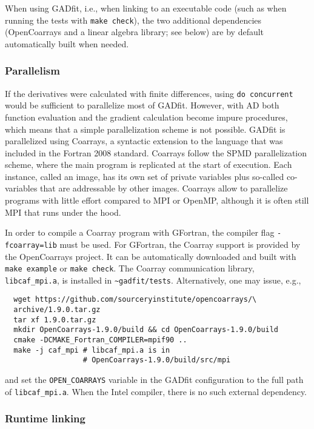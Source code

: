\documentclass{article}
\begin{document}
When using GADfit, i.e., when linking to an executable code (such as when running the tests with \texttt{make check}), the two additional dependencies (OpenCoarrays and a linear algebra library; see below) are by default automatically built when needed.

\subsubsection{\label{sec:parallelism}Parallelism}

If the derivatives were calculated with finite differences, using \texttt{do concurrent} would be sufficient to parallelize most of GADfit. However, with AD both function evaluation and the gradient calculation become impure procedures, which means that a simple parallelization scheme is not possible. GADfit is parallelized using Coarrays, a syntactic extension to the language that was included in the Fortran 2008 standard. Coarrays follow the SPMD parallelization scheme, where the main program is replicated at the start of execution. Each instance, called an image, has its own set of private variables plus so-called co-variables that are addressable by other images. Coarrays allow to parallelize programs with little effort compared to MPI or OpenMP, although it is often still MPI that runs under the hood.

In order to compile a Coarray program with GFortran, the compiler flag \texttt{-fcoarray=lib} must be used. For GFortran, the Coarray support is provided by the OpenCoarrays project. It can be automatically downloaded and built with \texttt{make example} or \texttt{make check}. The Coarray communication library, \verb+libcaf_mpi.a+, is installed in \verb+~gadfit/tests+. Alternatively, one may issue, e.g.,
\begin{verbatim}
  wget https://github.com/sourceryinstitute/opencoarrays/\
  archive/1.9.0.tar.gz
  tar xf 1.9.0.tar.gz
  mkdir OpenCoarrays-1.9.0/build && cd OpenCoarrays-1.9.0/build
  cmake -DCMAKE_Fortran_COMPILER=mpif90 ..
  make -j caf_mpi # libcaf_mpi.a is in
                  # OpenCoarrays-1.9.0/build/src/mpi
\end{verbatim}
and set the \verb+OPEN_COARRAYS+ variable in the GADfit configuration to the full path of \verb+libcaf_mpi.a+. When the Intel compiler, there is no such external dependency.

\subsubsection{\label{sec:runtime}Runtime linking}
\end{document}
